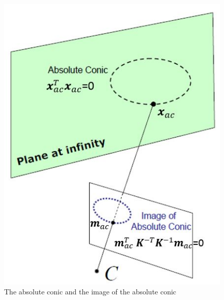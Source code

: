 \documentclass[12pt,oneside,openany,a4paper, %
english, %
masters-t, goldenblock]{usthesis}
\begin{document}
\begin{figure}[H]
    \centering
    \includegraphics[scale=0.5]{AbsoluteConic}
    \caption{The absolute conic and the image of the absolute conic \cite{emerging}}
    \label{fig:absconic}
\end{figure}
\end{document}
